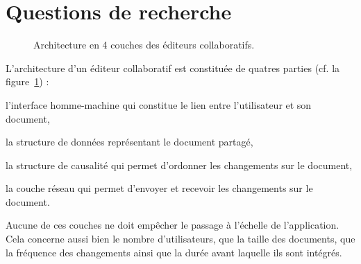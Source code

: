 
\section{Questions de recherche}

\begin{figure}
  \centering
  
  \caption[Architecture des éditeurs collaboratifs]
  {\label{intro:fig:architecture} Architecture en 4 couches des éditeurs
    collaboratifs.}
\end{figure}

L'architecture d'un éditeur collaboratif est constituée de quatres parties
(cf. la figure~\ref{intro:fig:architecture}) :
\begin{inparaenum}[(i)]
\item l'interface homme-machine qui constitue le lien entre l'utilisateur et son
  document, 
\item la structure de données représentant le document partagé,
\item la structure de causalité qui permet d'ordonner les changements sur le
  document,
\item la couche réseau qui permet d'envoyer et recevoir les changements sur le
  document.
\end{inparaenum}

Aucune de ces couches ne doit empêcher le passage à l'échelle de l'application.
Cela concerne aussi bien le nombre d'utilisateurs, que la taille des documents,
que la fréquence des changements ainsi que la durée avant laquelle ils sont
intégrés.

